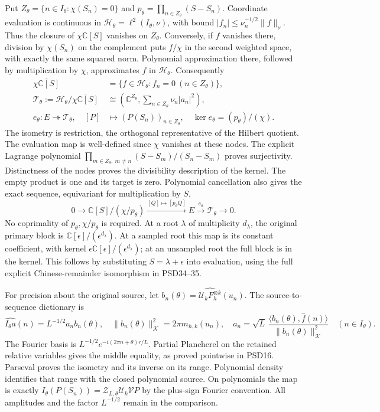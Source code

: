 Put \(Z_\theta=\{n\in I_\theta:\chi(S_n)=0\}\) and
\(p_\theta=\prod_{n\in Z_\theta}(S-S_n)\). Coordinate evaluation
is continuous in \(\mathcal H_\theta=\ell^2(I_\theta,\nu)\),
with bound \(|f_n|\le\nu_n^{-1/2}\|f\|_\nu\).
Thus the closure of \(\chi\mathbb C[S]\) vanishes on \(Z_\theta\).
Conversely, if \(f\) vanishes there, division by \(\chi(S_n)\)
on the complement puts \(f/\chi\) in the second weighted space,
with exactly the same squared norm. Polynomial approximation
there, followed by multiplication by \(\chi\), approximates
\(f\) in \(\mathcal H_\theta\). Consequently
\[
 \begin{split}
 \overline{\chi\mathbb C[S]}
 &=\{f\in\mathcal H_\theta:f_n=0\ (n\in Z_\theta)\},\\
 \mathcal T_\theta:=
 \mathcal H_\theta/\overline{\chi\mathbb C[S]}
 &\cong\left(\mathbb C^{Z_\theta},
          \sum_{n\in Z_\theta}\nu_n|a_n|^2\right),\\
 e_\theta:E\twoheadrightarrow\mathcal T_\theta,\quad
 [P]&\longmapsto(P(S_n))_{n\in Z_\theta},\quad
 \ker e_\theta=(p_\theta)/(\chi).
 \end{split}
 \tag{HDI17}
\]
The isometry is restriction, the orthogonal representative of
the Hilbert quotient. The evaluation map is well-defined since
\(\chi\) vanishes at these nodes. The explicit Lagrange polynomial
\(\prod_{m\in Z_\theta,\ m\ne n}(S-S_m)/(S_n-S_m)\)
proves surjectivity. Distinctness of the nodes proves the
divisibility description of the kernel. The empty product is
one and its target is zero. Polynomial cancellation also gives
the exact sequence, equivariant for multiplication by \(S\),
\[
 0\longrightarrow\mathbb C[S]/(\chi/p_\theta)
 \xrightarrow{[Q]\mapsto[p_\theta Q]}E
 \xrightarrow{e_\theta}\mathcal T_\theta\longrightarrow0.
 \tag{HDI18}
\]
No coprimality of \(p_\theta,\chi/p_\theta\) is required.
At a root \(\lambda\) of multiplicity \(d_\lambda\), the original
primary block is \(\mathbb C[\epsilon]/(\epsilon^{d_\lambda})\).
At a sampled root this map is its constant coefficient, with
kernel \(\epsilon\mathbb C[\epsilon]/(\epsilon^{d_\lambda})\);
at an unsampled root the full block is in the kernel. This
follows by substituting \(S=\lambda+\epsilon\) into evaluation,
using the full explicit Chinese-remainder isomorphism in
PSD34--35.

For precision about the original source, let
\(b_n(\theta)=\widehat{\mathcal U_kF_h^{\otimes k}}(u_n)\).
The source-to-sequence dictionary is
\[
 \widehat{I_\theta a}(n)=L^{-1/2}a_nb_n(\theta),\quad
 \|b_n(\theta)\|_{\mathcal K}^2=2\pi m_{h,k}(u_n),\quad
 a_n=\sqrt L\,\frac{\langle b_n(\theta),\widehat f(n)\rangle}
                         {\|b_n(\theta)\|_{\mathcal K}^2}
 \quad(n\in I_\theta).
 \tag{HDI19}
\]
The Fourier basis is
\(L^{-1/2}e^{-i(2\pi n+\theta)r/L}\). Partial Plancherel on the
retained relative variables gives the middle equality, as
proved pointwise in PSD16. Parseval proves the isometry and its
inverse on its range. Polynomial density identifies that range
with the closed polynomial source. On polynomials the map is
exactly
\(I_\theta(P(S_n))=\mathcal Z_{L,\theta}\mathcal U_k\mathcal VP\)
by the plus-sign Fourier convention. All amplitudes and the
factor \(L^{-1/2}\) remain in the comparison.

